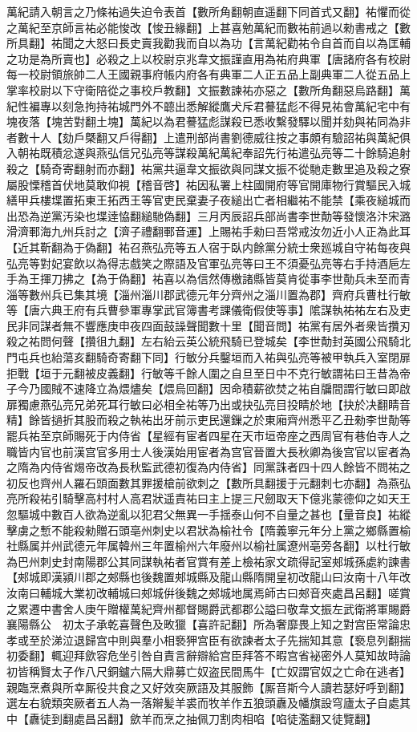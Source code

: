 萬紀請入朝言之乃條祐過失迫令表首【數所角翻朝直遥翻下同首式又翻】祐懼而從之萬紀至京師言祐必能悛改【悛丑緣翻】上甚喜勉萬紀而數祐前過以勑書戒之【數所具翻】祐聞之大怒曰長史賣我勸我而自以為功【言萬紀勸祐令自首而自以為匡輔之功是為所賣也】必殺之上以校尉京兆韋文振謹直用為祐府典軍【唐諸府各有校尉每一校尉領旅帥二人王國親事府帳内府各有典軍二人正五品上副典軍二人從五品上掌率校尉以下守衛陪從之事校戶教翻】文振數諫祐亦惡之【數所角翻惡烏路翻】萬紀性褊專以刻急拘持祐城門外不聼出悉解縱鷹犬斥君謩猛彪不得見祐會萬紀宅中有塊夜落【塊苦對翻土塊】萬紀以為君謩猛彪謀殺已悉收繫發驛以聞并劾與祐同為非者數十人【劾戶槩翻又戶得翻】上遣刑部尚書劉德威往按之事頗有驗詔祐與萬紀俱入朝祐既積忿遂與燕弘信兄弘亮等謀殺萬紀萬紀奉詔先行祐遣弘亮等二十餘騎追射殺之【騎奇寄翻射而亦翻】祐黨共逼韋文振欲與同謀文振不從馳走數里追及殺之寮屬股慄稽首伏地莫敢仰視【稽音啓】祐因私署上柱國開府等官開庫物行賞驅民入城繕甲兵樓堞置拓東王拓西王等官吏民棄妻子夜縋出亡者相繼祐不能禁【乘夜縋城而出恐為逆黨汚染也堞逹恊翻縋馳偽翻】三月丙辰詔兵部尚書李世勣等發懷洛汴宋潞滑濟鄆海九州兵討之【濟子禮翻鄆音運】上賜祐手勑曰吾常戒汝勿近小人正為此耳【近其靳翻為于偽翻】祐召燕弘亮等五人宿于臥内餘黨分統士衆廵城自守祐每夜與弘亮等對妃宴飲以為得志戲笑之際語及官軍弘亮等曰王不須憂弘亮等右手持酒巵左手為王揮刀拂之【為于偽翻】祐喜以為信然傳檄諸縣皆莫肯從事李世勣兵未至而青淄等數州兵已集其境【淄州淄川郡武德元年分齊州之淄川置為郡】齊府兵曹杜行敏等【唐六典王府有兵曹參軍專掌武官簿書考課儀衛假使等事】隂謀執祐祐左右及吏民非同謀者無不響應庚申夜四面鼓譟聲聞數十里【聞音問】祐黨有居外者衆皆攢刃殺之祐問何聲【攢徂九翻】左右紿云英公統飛騎已登城矣【李世勣封英國公飛騎北門屯兵也紿蕩亥翻騎奇寄翻下同】行敏分兵鑿垣而入祐與弘亮等被甲執兵入室閉扉拒戰【垣于元翻被皮義翻】行敏等千餘人圍之自旦至日中不克行敏謂祐曰王昔為帝子今乃國賊不速降立為煨燼矣【煨烏回翻】因命積薪欲焚之祐自牖間謂行敏曰即啟扉獨慮燕弘亮兄弟死耳行敏曰必相全祐等乃出或抉弘亮目投睛於地【抉於决翻睛音精】餘皆撾折其股而殺之執祐出牙前示吏民還鏁之於東廂齊州悉平乙丑勑李世勣等罷兵祐至京師賜死于内侍省【星經有宦者四星在天市垣帝座之西周官有巷伯寺人之職皆内官也前漢宫官多用士人後漢始用宦者為宫官晉置大長秋卿為後宫官以宦者為之隋為内侍省焬帝改為長秋監武德初復為内侍省】同黨誅者四十四人餘皆不問祐之初反也齊州人羅石頭面數其罪援槍前欲刺之【數所具翻援于元翻刺七亦翻】為燕弘亮所殺祐引騎擊高村村人高君狀遥責祐曰主上提三尺劒取天下億兆蒙德仰之如天王忽驅城中數百人欲為逆亂以犯君父無異一手揺泰山何不自量之甚也【量音良】祐縱擊虜之慙不能殺勑贈石頭亳州刺史以君狀為榆社令【隋義寧元年分上黨之鄉縣置榆社縣属并州武德元年属韓州三年置榆州六年廢州以榆社属遼州亳旁各翻】以杜行敏為巴州刺史封南陽郡公其同謀執祐者官賞有差上檢祐家文疏得記室郟城孫處約諫書【郟城即漢潁川郡之郟縣也後魏置郟城縣及龍山縣隋開皇初改龍山曰汝南十八年改汝南曰輔城大業初改輔城曰郟城倂後魏之郟城地属焉師古曰郟音夾處昌呂翻】嗟賞之累遷中書舍人庚午贈權萬紀齊州都督賜爵武都郡公謚曰敬韋文振左武衛將軍賜爵襄陽縣公　初太子承乾喜聲色及畋獵【喜許記翻】所為奢靡畏上知之對宫臣常論忠孝或至於涕泣退歸宫中則與羣小相䙝狎宫臣有欲諫者太子先揣知其意【䙝息列翻揣初委翻】輒迎拜歛容危坐引咎自責言辭辯給宫臣拜答不暇宫省袐密外人莫知故時論初皆稱賢太子作八尺銅鑪六隔大鼎募亡奴盗民間馬牛【亡奴謂官奴之亡命在逃者】親臨烹煮與所幸厮役共食之又好效突厥語及其服飾【厮音斯今人讀若瑟好呼到翻】選左右貌類突厥者五人為一落辮髪羊裘而牧羊作五狼頭纛及幡旗設穹廬太子自處其中【纛徒到翻處昌呂翻】歛羊而烹之抽佩刀割肉相啗【啗徒濫翻又徒覽翻】